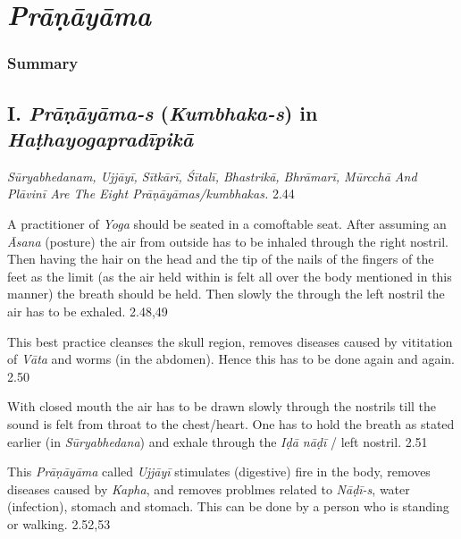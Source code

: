 \chapter{\textit{Prāṇāyāma}}

\subsection*{Summary}

\section*{I. \textit{Prāṇāyāma-s} (\textit{Kumbhaka-s}) in \textit{Haṭhayogapradī\-pikā}}

\textit{Sūryabhedanam, Ujjāyī, Sītkārī, Śītalī, Bhastrikā, Bhrāmarī, Mūrcchā And Plāvinī Are The Eight Prāṇāyāmas/kumbhakas.} 2.44


A practitioner of \textit{Yoga} should be seated in a comoftable seat. After assuming an \textit{Āsana} (posture) the air from outside has to be inhaled through the right nostril.  Then having the hair on the head and the tip of the nails of the fingers of the feet as the limit (as the air held within is felt all over the body mentioned in this manner) the breath should be held. Then slowly the through the left nostril the air has to be exhaled.  2.48,49


This best practice cleanses the skull region, removes diseases caused by vititation of \textit{Vāta} and worms (in the abdomen). Hence this has to be done again and again. 2.50


With closed mouth the air has to be drawn slowly through the nostrils till the sound is felt from throat to the chest/heart. One has to hold the breath as stated earlier (in \textit{Sūryabhedana}) and exhale through the \textit{Iḍā nāḍī} / left nostril. 2.51


This \textit{Prāṇāyāma} called \textit{Ujjāyī} stimulates (digestive) fire in the body, removes diseases caused by \textit{Kapha}, and removes problmes related to \textit{Nāḍī-s}, water (infection), stomach and stomach. This can be done by a person who is standing or walking.  2.52,53


